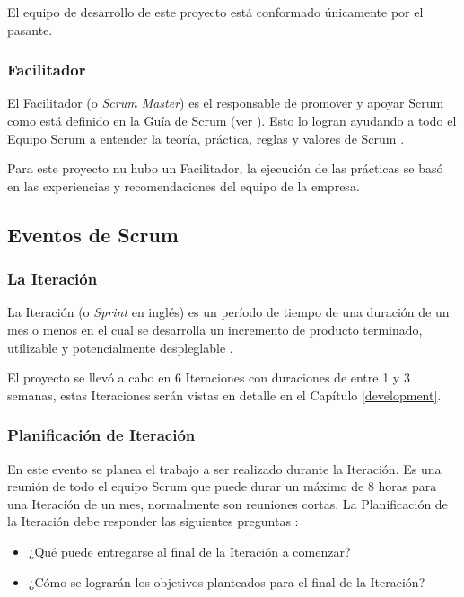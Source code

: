 El equipo de desarrollo de este proyecto está conformado únicamente por el pasante.

\subsubsection{Facilitador} \label{scrumMaster}
El Facilitador (o \emph{Scrum Master}) es el responsable de promover y apoyar Scrum como está definido en la Guía de Scrum (ver \cite{scrumSchwaber}). Esto lo logran ayudando a todo el Equipo Scrum a entender la teoría, práctica, reglas y valores de Scrum \cite{scrumSchwaber}.

Para este proyecto nu hubo un Facilitador, la ejecución de las prácticas se basó en las experiencias y recomendaciones del equipo de la empresa.

\subsection{Eventos de Scrum}
\subsubsection{La Iteración} \label{sprint}
La Iteración (o \emph{Sprint} en inglés) es un período de tiempo de una duración de un mes o menos en el cual se desarrolla un incremento de producto terminado, utilizable y potencialmente despleglable \cite{scrumSchwaber}.

El proyecto se llevó a cabo en 6 Iteraciones con duraciones de entre 1 y 3 semanas, estas Iteraciones serán vistas en detalle en el Capítulo \ref{development}.

\subsubsection{Planificación de Iteración}
En este evento se planea el trabajo a ser realizado durante la Iteración. Es una reunión de todo el equipo Scrum que puede durar un máximo de 8 horas para una Iteración de un mes, normalmente son reuniones cortas. La Planificación de la Iteración debe responder las siguientes preguntas \cite{scrumSchwaber}:

\begin{itemize}
    \item ¿Qué puede entregarse al final de la Iteración a comenzar?
    \item ¿Cómo se lograrán los objetivos planteados para el final de la Iteración?
\end{itemize}

